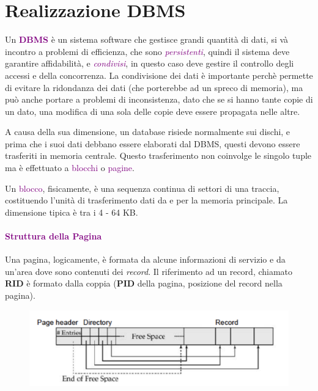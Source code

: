 \section{Realizzazione DBMS}

Un \textbf{\textcolor{purple}{DBMS}} è un sistema software che
gestisce grandi quantità di dati, si và incontro
a problemi di efficienza, che sono \emph{\textcolor{purple}{persistenti}}, quindi il sistema
deve garantire affidabilità, e \emph{\textcolor{purple}{condivisi}}, in questo caso deve gestire il
controllo degli accessi e della concorrenza. La condivisione dei dati
è importante perchè permette di evitare la ridondanza dei dati (che porterebbe ad un spreco di memoria),
ma può anche portare a problemi di inconsistenza, dato che se si hanno tante copie
di un dato, una modifica di una sola delle copie deve essere propagata nelle altre.

A causa della sua dimensione, un database risiede normalmente
sui dischi, e prima che i suoi dati debbano essere elaborati dal
DBMS, questi devono essere trasferiti in memoria centrale. Questo
trasferimento non coinvolge le singolo tuple ma è effettuato
a \textcolor{purple}{blocchi} o \textcolor{purple}{pagine}.

Un \textcolor{purple}{blocco}, fisicamente, è una sequenza
continua di settori di una traccia, costituendo l'unità di trasferimento
dati da e per la memoria principale. La dimensione tipica è tra i 4 - 64 KB.

\paragraph{\textcolor{purple}{Struttura della Pagina}} Una pagina, logicamente,
è formata da alcune informazioni di servizio e da un'area dove sono contenuti
dei \emph{record}. Il riferimento ad un record, chiamato \textbf{RID} è formato
dalla coppia (\textbf{PID} della pagina, posizione del record nella pagina).

\begin{figure}[H]
    \centering
    \includegraphics[scale=0.55]{img/rid.png}
\end{figure}

